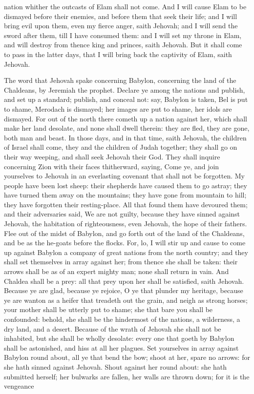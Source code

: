 nation whither the outcasts of Elam shall not come. And I will cause Elam to be dismayed before their enemies, and before them that seek their life; and I will bring evil upon them, even my fierce anger, saith Jehovah; and I will send the sword after them, till I have consumed them: and I will set my throne in Elam, and will destroy from thence king and princes, saith Jehovah. But it shall come to pass in the latter days, that I will bring back the captivity of Elam, saith Jehovah. 

The word that Jehovah spake concerning Babylon, concerning the land of the Chaldeans, by Jeremiah the prophet.  Declare ye among the nations and publish, and set up a standard; publish, and conceal not: say, Babylon is taken, Bel is put to shame, Merodach is dismayed; her images are put to shame, her idols are dismayed. For out of the north there cometh up a nation against her, which shall make her land desolate, and none shall dwell therein: they are fled, they are gone, both man and beast. In those days, and in that time, saith Jehovah, the children of Israel shall come, they and the children of Judah together; they shall go on their way weeping, and shall seek Jehovah their God. They shall inquire concerning Zion with their faces thitherward, saying, Come ye, and join yourselves to Jehovah in an everlasting covenant that shall not be forgotten.  My people have been lost sheep: their shepherds have caused them to go astray; they have turned them away on the mountains; they have gone from mountain to hill; they have forgotten their resting-place. All that found them have devoured them; and their adversaries said, We are not guilty, because they have sinned against Jehovah, the habitation of righteousness, even Jehovah, the hope of their fathers. Flee out of the midst of Babylon, and go forth out of the land of the Chaldeans, and be as the he-goats before the flocks. For, lo, I will stir up and cause to come up against Babylon a company of great nations from the north country; and they shall set themselves in array against her; from thence she shall be taken: their arrows shall be as of an expert mighty man; none shall return in vain. And Chaldea shall be a prey: all that prey upon her shall be satisfied, saith Jehovah.  Because ye are glad, because ye rejoice, O ye that plunder my heritage, because ye are wanton as a heifer that treadeth out the grain, and neigh as strong horses; your mother shall be utterly put to shame; she that bare you shall be confounded: behold, she shall be the hindermost of the nations, a wilderness, a dry land, and a desert. Because of the wrath of Jehovah she shall not be inhabited, but she shall be wholly desolate: every one that goeth by Babylon shall be astonished, and hiss at all her plagues. Set yourselves in array against Babylon round about, all ye that bend the bow; shoot at her, spare no arrows: for she hath sinned against Jehovah. Shout against her round about: she hath submitted herself; her bulwarks are fallen, her walls are thrown down; for it is the vengeance 